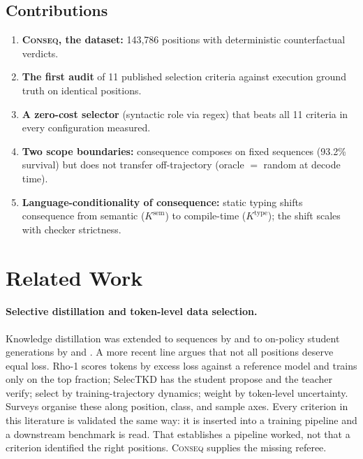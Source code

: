 \documentclass[twoside,11pt]{article}
\begin{document}
\subsection{Contributions}

\begin{enumerate}
\item \textbf{\textsc{Conseq}, the dataset:} 143,786 positions with deterministic counterfactual verdicts.
\item \textbf{The first audit} of 11 published selection criteria against execution ground truth on identical positions.
\item \textbf{A zero-cost selector} (syntactic role via regex) that beats all 11 criteria in every configuration measured.
\item \textbf{Two scope boundaries:} consequence composes on fixed sequences (93.2\% survival) but does not transfer off-trajectory (oracle $=$ random at decode time).
\item \textbf{Language-conditionality of consequence:} static typing shifts consequence from semantic ($K^{\mathrm{sem}}$) to compile-time ($K^{\mathrm{type}}$); the shift scales with checker strictness.
\end{enumerate}

\section{Related Work}

\paragraph{Selective distillation and token-level data selection.}
Knowledge distillation \citep{hinton2015distilling} was extended to sequences by
\citet{kim2016sequence} and to on-policy student generations by \citet{agarwal2024gkd} and
\citet{gu2024minillm}. A more recent line argues that not all positions deserve equal loss.
Rho-1 \citep{lin2024rho} scores tokens by excess loss against a reference model and trains only on
the top fraction; SelecTKD \citep{selectkd2025} has the student propose and the teacher verify;
\citet{t3s2026} select by training-trajectory dynamics; \citet{tokenuncertainty2025} weight by
token-level uncertainty. Surveys \citep{opdsurvey2026, rethinkingselective2026} organise these along
position, class, and sample axes. Every criterion in this literature is validated the same way: it
is inserted into a training pipeline and a downstream benchmark is read. That establishes a pipeline
worked, not that a criterion identified the right positions. \textsc{Conseq} supplies the missing
referee.
\end{document}
